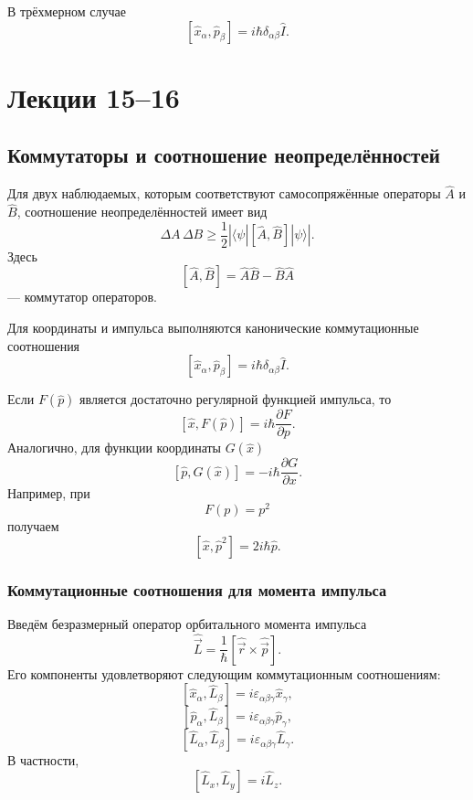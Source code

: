 \documentclass[12pt,a4paper]{article}
\begin{document}
В трёхмерном случае
\[
    \boxed{
        [\hat x_\alpha,\hat p_\beta]
        =
        i\hbar\delta_{\alpha\beta}\hat I
    }.
\]

\section{Лекции 15--16}

\subsection{Коммутаторы и соотношение неопределённостей}

Для двух наблюдаемых, которым соответствуют самосопряжённые операторы
$\hat A$ и $\hat B$, соотношение неопределённостей имеет вид
\[
    \boxed{
        \Delta A\,\Delta B
        \geq
        \frac12
        \left|
            \langle\psi|[\hat A,\hat B]|\psi\rangle
        \right|
    }.
\]
Здесь
\[
    [\hat A,\hat B]=\hat A\hat B-\hat B\hat A
\]
--- коммутатор операторов.

Для координаты и импульса выполняются канонические коммутационные
соотношения
\[
    \boxed{
        [\hat x_\alpha,\hat p_\beta]
        =
        i\hbar\delta_{\alpha\beta}\hat I
    }.
\]

Если $F(\hat p)$ является достаточно регулярной функцией импульса, то
\[
    \boxed{
        [\hat x,F(\hat p)]
        =
        i\hbar\frac{\partial F}{\partial p}
    }.
\]
Аналогично, для функции координаты $G(\hat x)$
\[
    \boxed{
        [\hat p,G(\hat x)]
        =
        -i\hbar\frac{\partial G}{\partial x}
    }.
\]
Например, при
\[
    F(p)=p^2
\]
получаем
\[
    \boxed{
        [\hat x,\hat p^2]
        =
        2i\hbar\hat p
    }.
\]

\subsubsection{Коммутационные соотношения для момента импульса}

Введём безразмерный оператор орбитального момента импульса
\[
    \boxed{
        \hat{\vec L}
        =
        \frac{1}{\hbar}
        [\hat{\vec r}\times\hat{\vec p}]
    }.
\]
Его компоненты удовлетворяют следующим коммутационным соотношениям:
\[
    \boxed{
        [\hat x_\alpha,\hat L_\beta]
        =
        i\varepsilon_{\alpha\beta\gamma}\hat x_\gamma
    },
\]
\[
    \boxed{
        [\hat p_\alpha,\hat L_\beta]
        =
        i\varepsilon_{\alpha\beta\gamma}\hat p_\gamma
    },
\]
\[
    \boxed{
        [\hat L_\alpha,\hat L_\beta]
        =
        i\varepsilon_{\alpha\beta\gamma}\hat L_\gamma
    }.
\]
В частности,
\[
    [\hat L_x,\hat L_y]
    =
    i\hat L_z.
\]
\end{document}
